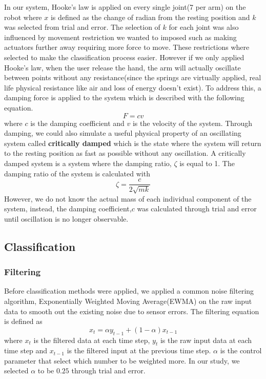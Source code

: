 In our system, Hooke's law is applied on every single joint(7 per arm) on the robot where $x$ is defined as the change of radian from the resting position and $k$ was selected from trial and error. The selection of $k$ for each joint was also influenced by movement restriction we wanted to imposed such as making actuators further away requiring more force to move. These restrictions where selected to make the classification process easier.
However if we only applied Hooke's law, when the user release the hand, the arm will actually oscillate between points without any resistance(since the springs are virtually applied, real life physical resistance like air and loss of energy doesn't exist). To address this, a damping force \cite{wiki:damping} is applied to the system which is described with the following equation.
\begin{equation}
F = cv
\end{equation}
where $c$ is the damping coefficient and $v$ is the velocity of the system. Through damping, we could also simulate a useful physical property of an oscillating system called \textbf{critically damped} which is the state where the system will return to the resting position as fast as possible without any oscillation. A critically damped system is a system where the damping ratio, $\zeta$ is equal to 1. The damping ratio of the system is calculated with
\begin{equation}
\zeta = \frac{c}{2\sqrt{mk}}
\end{equation}
However, we do not know the actual mass of each individual component of the system, instead, the damping coefficient,$c$ was calculated through trial and error until oscillation is no longer observable.


\subsection{Classification}
\subsubsection{Filtering}
Before classification methods were applied, we applied a common noise filtering algorithm, Exponentially Weighted Moving Average(EWMA) on the raw input data to smooth out the existing noise due to sensor errors. The filtering equation is defined as
\begin{equation}
x_t = \alpha y_{t-1} + (1 - \alpha)x_{t-1}
\end{equation}
where $x_t$ is the filtered data at each time step, $y_t$ is the raw input data at each time step and $x_{t-1}$ is the filtered input at the previous time step. $\alpha$ is the control parameter that select which number to be weighted more. In our study, we selected $\alpha$ to be $0.25$ through trial and error.\\


